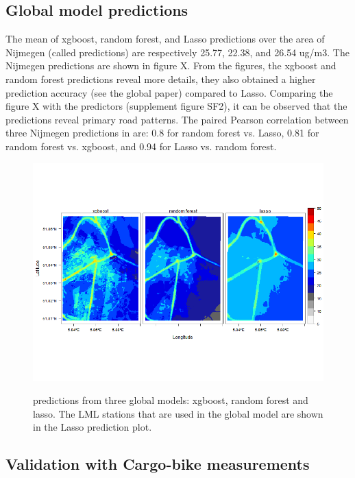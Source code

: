 \documentclass{article}
\begin{document}
\subsection{Global model predictions}
The mean of xgboost, random forest, and Lasso predictions over the area of Nijmegen (called predictions) are respectively 25.77, 22.38, and 26.54 ug/m3. The Nijmegen predictions are shown in figure X. From the figures, the xgboost and random forest predictions reveal more details, they also obtained a higher prediction accuracy (see the global paper) compared to Lasso. Comparing the figure X with the predictors (supplement figure SF2), it can be observed that the predictions reveal primary road patterns. The paired Pearson correlation between three Nijmegen predictions in are: 0.8 for random forest vs. Lasso, 0.81 for random forest vs. xgboost, and 0.94 for Lasso vs. random forest.
\begin{figure}[h!]
    \includegraphics[width=\linewidth]{f3.png}
    \label{seperate}
    \caption {predictions from three global models: xgboost, random forest and lasso. The LML stations that are used in the global model are shown in the Lasso prediction plot.}
\end{figure}
\subsection{Validation with Cargo-bike measurements}
\end{document}
